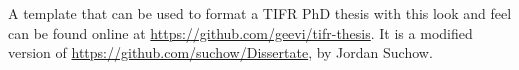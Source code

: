 \newpage

\vspace*{200pt}

\begin{center} A template that can be used to format a TIFR PhD thesis with this look and feel
can be found online at \href{https://github.com/geevi/tifr-thesis}{https://github.com/geevi/tifr-thesis}. It is a modified version of \href{https://github.com/suchow/Dissertate}{https://github.com/suchow/Dissertate}, by Jordan Suchow.
\end{center}
